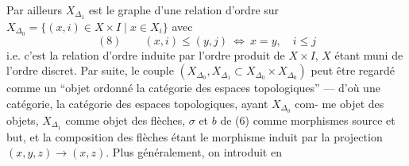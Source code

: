 Par ailleurs $X_{\Delta_1}$ est le graphe d'une relation
d'ordre sur $X_{\Delta_0}=\{(x,i)\in X\times I\mid x\in X_i\}$
avec
\[
(8)\qquad (x,i)\leq(y,j)\ \Longleftrightarrow\ x=y,\quad i\leq j
\]
i.e. c'est la relation d'ordre induite par
l'ordre produit de $X\times I$, $X$ étant muni
de l'ordre discret. Par suite, le
couple $(X_{\Delta_0},X_{\Delta_1}\subset X_{\Delta_0}\times X_{\Delta_0})$ peut
être regardé comme un ``objet ordonné 
la catégorie des espaces topologiques'' ---
d'où une catégorie,  la catégorie
des espaces topologiques, ayant $X_{\Delta_0}$ com-
me objet des objets, $X_{\Delta_1}$ comme objet
des flèches, $\sigma$ et $b$ de (6) comme
morphismes source et but, et la
composition des flèches étant le
morphisme
induit par la projection $(x,y,z)\longrightarrow(x,z)$.
Plus généralement, on introduit en

